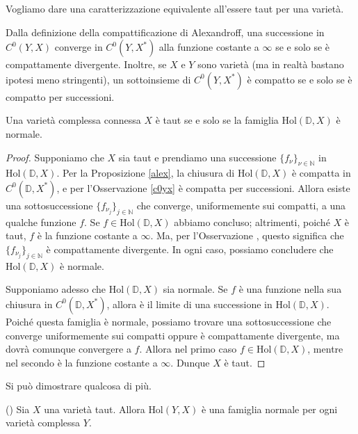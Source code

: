 Vogliamo dare una caratterizzazione equivalente all'essere taut per una varietà.

\begin{oss} \label{c0yx}
    Dalla definizione della compattificazione di Alexandroff, una successione in $C^0(Y,X)$ converge in $C^0(Y,X^*)$ alla funzione costante a $\infty$ se e solo se è compattamente divergente. Inoltre, se $X$ e $Y$ sono varietà (ma in realtà bastano ipotesi meno stringenti), un sottoinsieme di $C^0(Y,X^*)$ è compatto se e solo se è compatto per successioni.
\end{oss}

\begin{cor}
    Una varietà complessa connessa $X$ è taut se e solo se la famiglia $\text{Hol}(\mathbb{D},X)$ è normale.
\end{cor}
\begin{proof}
    Supponiamo che $X$ sia taut e prendiamo una successione $\{f_{\nu}\}_{\nu\in\mathbb{N}}$ in $\text{Hol}(\mathbb{D},X)$. Per la Proposizione \ref{alex}, la chiusura di $\text{Hol}(\mathbb{D},X)$ è compatta in $C^0(\mathbb{D},X^*)$, e per l'Osservazione \ref{c0yx} è compatta per successioni. Allora esiste una sottosuccessione $\{f_{\nu_j}\}_{j \in \mathbb{N}}$ che converge, uniformemente sui compatti, a una qualche funzione $f$. Se $f \in \text{Hol}(\mathbb{D},X)$ abbiamo concluso; altrimenti, poiché $X$ è taut, $f$ è la funzione costante a $\infty$. Ma, per l'Osservazione \label{c0yx}, questo significa che $\{f_{\nu_j}\}_{j \in \mathbb{N}}$ è compattamente divergente. In ogni caso, possiamo concludere che $\text{Hol}(\mathbb{D},X)$ è normale.

    Supponiamo adesso che $\text{Hol}(\mathbb{D},X)$ sia normale. Se $f$ è una funzione nella sua chiusura in $C^0(\mathbb{D},X^*)$, allora è il limite di una successione in $\text{Hol}(\mathbb{D},X)$. Poiché questa famiglia è normale, possiamo trovare una sottosuccessione che converge uniformemente sui compatti oppure è compattamente divergente, ma dovrà comunque convergere a $f$. Allora nel primo caso $f \in \text{Hol}(\mathbb{D},X)$, mentre nel secondo è la funzione costante a $\infty$. Dunque $X$ è taut.
\end{proof}

Si può dimostrare qualcosa di più.

\begin{prop}
    (\cite[Theorem 2.1.2]{A1}) Sia $X$ una varietà taut. Allora $\text{Hol}(Y,X)$ è una famiglia normale per ogni varietà complessa $Y$.
\end{prop}

